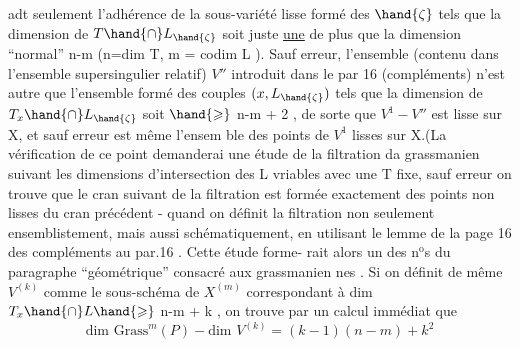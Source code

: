 
adt seulement l'adhérence de la sous-variété lisse formé des $\hand{\zeta}$ tels que
la dimension de $T\hand{\cap}L_{\hand{\zeta}}$ soit juste \uline{une} de plus que la dimension
``normal'' n-m (n=dim T, m = codim L ). Sauf erreur, l'ensemble
(contenu dans l'ensemble supersingulier relatif) $V''$ introduit dans le par
16 (compléments) n'est autre que l'ensemble formé des couples
$(x,L_{\hand{\zeta}})$ tels que la dimension de $T_x\hand{\cap}L_{\hand{\zeta}}$ soit $\hand{\geqslant}$ n-m + 2\hand{)} , de sorte que
 $V^1 - V''$ est  lisse sur X, et sauf erreur est même  l'ensem
ble des points de $V^1$ lisses sur X.(La vérification de ce point demanderai
une étude de la filtration da   grassmanien suivant les 
dimensions d'intersection des L vriables avec une T fixe, sauf erreur on
trouve que le cran suivant de la filtration est formée exactement des
points non lisses du cran précédent - quand on définit la filtration
 non seulement ensemblistement, mais aussi schématiquement, en utilisant
le lemme de la page 16 des compléments au par.16 \hand{\unsure{)|\S}}. Cette étude forme-%
rait alors un des n$^{\text{o}}$s du paragraphe ``géométrique'' consacré aux grassmanien
nes \hand{)}. Si on définit de même  $V^{(k)}$ comme le sous-schéma de $X^{(m)}$
correspondant à dim $T_x\hand{\cap}L \hand{\geqslant}$ n-m + k , on trouve par un calcul immédiat
que 
\[ \text{dim Grass}^m(P) - \text{dim } V^{(k)} = (k-1)(n-m) + k^2 \]

